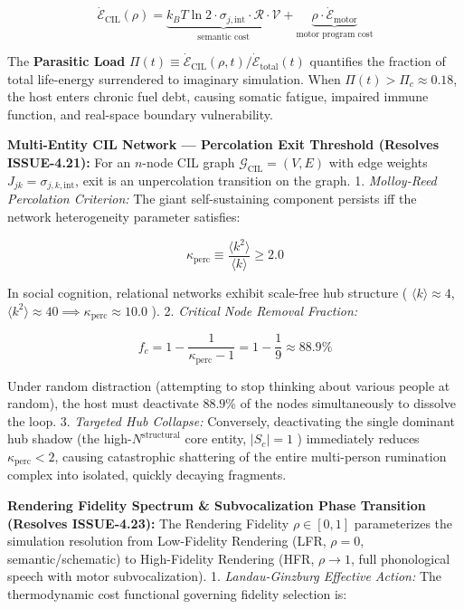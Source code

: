 \documentclass[11pt,a4paper]{article}
\theoremstyle{definition}
\theoremstyle{remark}
\begin{document}
\begin{equation}
\boxed{\dot{\mathcal{E}}_{\text{CIL}}(\rho) = \underbrace{k_B T \ln 2 \cdot \sigma_{j,\text{int}} \cdot \mathcal{R} \cdot \mathcal{V}}_{\text{semantic cost}} + \underbrace{\rho \cdot \dot{\mathcal{E}}_{\text{motor}}}_{\text{motor program cost}}}
\end{equation}


The \textbf{Parasitic Load} $\Pi(t) \equiv \dot{\mathcal{E}}_{\text{CIL}}(\rho, t) / \dot{\mathcal{E}}_{\text{total}}(t)$ quantifies the fraction of total life-energy surrendered to imaginary simulation. When $\Pi(t) > \Pi_c \approx 0.18$, the host enters chronic fuel debt, causing somatic fatigue, impaired immune function, and real-space boundary vulnerability.

\textbf{Multi-Entity CIL Network — Percolation Exit Threshold (Resolves ISSUE-4.21):}
For an $n$-node CIL graph $\mathcal{G}_{\text{CIL}} = (V, E)$ with edge weights $J_{jk} = \sigma_{j,k,\text{int}}$, exit is an unpercolation transition on the graph.
1. \textit{Molloy-Reed Percolation Criterion:} The giant self-sustaining component persists iff the network heterogeneity parameter satisfies:


\begin{equation}
\kappa_{\text{perc}} \equiv \frac{\langle k^2 \rangle}{\langle k \rangle} \ge 2.0
\end{equation}


In social cognition, relational networks exhibit scale-free hub structure ( $\langle k \rangle \approx 4$, $\langle k^2 \rangle \approx 40 \implies \kappa_{\text{perc}} \approx 10.0$ ).
2. \textit{Critical Node Removal Fraction:}


\begin{equation}
\boxed{f_c = 1 - \frac{1}{\kappa_{\text{perc}} - 1} = 1 - \frac{1}{9} \approx 88.9\%}
\end{equation}


Under random distraction (attempting to stop thinking about various people at random), the host must deactivate $88.9\%$ of the nodes simultaneously to dissolve the loop.
3. \textit{Targeted Hub Collapse:} Conversely, deactivating the single dominant hub shadow (the high-$N^{\text{structural}}$ core entity, $|S_c| = 1$ ) immediately reduces $\kappa_{\text{perc}} < 2$, causing catastrophic shattering of the entire multi-person rumination complex into isolated, quickly decaying fragments.

\textbf{Rendering Fidelity Spectrum \& Subvocalization Phase Transition (Resolves ISSUE-4.23):}
The Rendering Fidelity $\rho \in [0,1]$ parameterizes the simulation resolution from Low-Fidelity Rendering (LFR, $\rho = 0$, semantic/schematic) to High-Fidelity Rendering (HFR, $\rho \to 1$, full phonological speech with motor subvocalization).
1. \textit{Landau-Ginzburg Effective Action:} The thermodynamic cost functional governing fidelity selection is:
\end{document}

